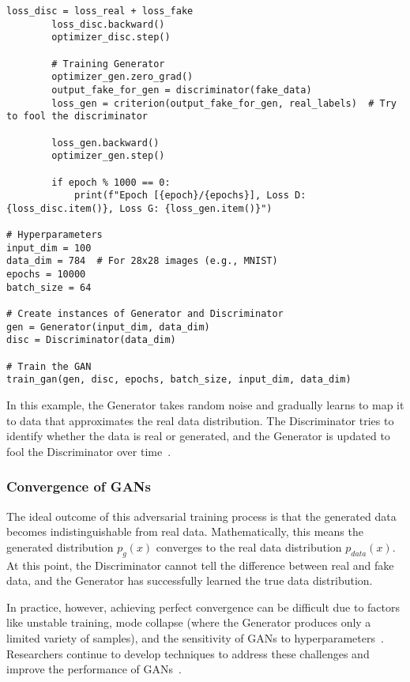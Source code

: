 \begin{lstlisting}[style=python]
        loss_disc = loss_real + loss_fake
        loss_disc.backward()
        optimizer_disc.step()
        
        # Training Generator
        optimizer_gen.zero_grad()
        output_fake_for_gen = discriminator(fake_data)
        loss_gen = criterion(output_fake_for_gen, real_labels)  # Try to fool the discriminator
        
        loss_gen.backward()
        optimizer_gen.step()

        if epoch % 1000 == 0:
            print(f"Epoch [{epoch}/{epochs}], Loss D: {loss_disc.item()}, Loss G: {loss_gen.item()}")
            
# Hyperparameters
input_dim = 100
data_dim = 784  # For 28x28 images (e.g., MNIST)
epochs = 10000
batch_size = 64

# Create instances of Generator and Discriminator
gen = Generator(input_dim, data_dim)
disc = Discriminator(data_dim)

# Train the GAN
train_gan(gen, disc, epochs, batch_size, input_dim, data_dim)
\end{lstlisting}

In this example, the Generator takes random noise and gradually learns to map it to data that approximates the real data distribution. The Discriminator tries to identify whether the data is real or generated, and the Generator is updated to fool the Discriminator over time~\cite{kingma2019introduction}.

\subsubsection{Convergence of GANs}
The ideal outcome of this adversarial training process is that the generated data becomes indistinguishable from real data. Mathematically, this means the generated distribution \( p_g(x) \) converges to the real data distribution \( p_{data}(x) \). At this point, the Discriminator cannot tell the difference between real and fake data, and the Generator has successfully learned the true data distribution.

In practice, however, achieving perfect convergence can be difficult due to factors like unstable training, mode collapse (where the Generator produces only a limited variety of samples), and the sensitivity of GANs to hyperparameters~\cite{farnia2020gans}. Researchers continue to develop techniques to address these challenges and improve the performance of GANs~\cite{heusel2017gans, kazeminia2020gans}.

